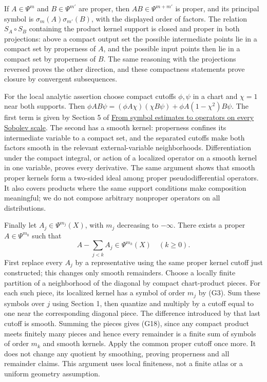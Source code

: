 \documentclass[
  11pt,
]{article}
\begin{document}
If \(A\in\Psi^m\) and \(B\in\Psi^{m'}\) are proper, then
\(AB\in\Psi^{m+m'}\) is proper, and its principal symbol is
\(\sigma_m(A)\sigma_{m'}(B)\), with the displayed order of factors. The
relation \(S_A\circ S_B\) containing the product kernel support is
closed and proper in both projections: above a compact output set the
possible intermediate points lie in a compact set by properness of
\(A\), and the possible input points then lie in a compact set by
properness of \(B\). The same reasoning with the projections reversed
proves the other direction, and these compactness statements prove
closure by convergent subsequences.

For the local analytic assertion choose compact cutoffs \(\phi,\psi\) in
a chart and \(\chi=1\) near both supports. Then
\(\phi AB\psi=(\phi A\chi)(\chi B\psi)+\phi A(1-\chi^2)B\psi\). The
first term is given by Section 5 of
\href{euclidean-symbol-calculus.pdf}{From symbol estimates to operators
on every Sobolev scale}. The second has a smooth kernel: properness
confines its intermediate variable to a compact set, and the separated
cutoffs make both factors smooth in the relevant external-variable
neighborhoods. Differentiation under the compact integral, or action of
a localized operator on a smooth kernel in one variable, proves every
derivative. The same argument shows that smooth proper kernels form a
two-sided ideal among proper pseudodifferential operators. It also
covers products where the same support conditions make composition
meaningful; we do not compose arbitrary nonproper operators on all
distributions.

Finally let \(A_j\in\Psi^{m_j}(X)\), with \(m_j\) decreasing to
\(-\infty\). There exists a proper \(A\in\Psi^{m_0}\) such that \[
A-\sum_{j<k}A_j\in\Psi^{m_k}(X)\quad(k\geq0).
\tag{G18}
\] First replace every \(A_j\) by a representative using the same proper
kernel cutoff just constructed; this changes only smooth remainders.
Choose a locally finite partition of a neighborhood of the diagonal by
compact chart-product pieces. For each such piece, its localized kernel
has a symbol of order \(m_j\) by (G3). Sum these symbols over \(j\)
using Section 1, then quantize and multiply by a cutoff equal to one
near the corresponding diagonal piece. The difference introduced by that
last cutoff is smooth. Summing the pieces gives (G18), since any compact
product meets finitely many pieces and hence every remainder is a finite
sum of symbols of order \(m_k\) and smooth kernels. Apply the common
proper cutoff once more. It does not change any quotient by smoothing,
proving properness and all remainder claims. This argument uses local
finiteness, not a finite atlas or a uniform geometry assumption.
\end{document}
